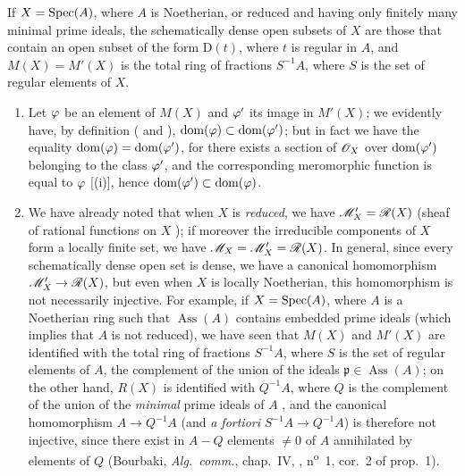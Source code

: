 \begin{corollary}[20.2.12]
\label{IV.20.2.12}
If $X=\operatorname{Spec}(A)$, where $A$ is Noetherian, or reduced and having only finitely many minimal prime ideals, the schematically dense open subsets of $X$ are those that contain an open subset of the form $\mathrm{D}(t)$, where $t$ is regular in $A$, and $M(X)=M'(X)$ is the total ring of fractions $S^{-1}A$, where $S$ is the set of regular elements of $X$.
\end{corollary}

\begin{remarks}[20.2.13]\label{IV.20.2.13}
\begin{enumerate}[label=(\roman*)]
  \item Let $\varphi$ be an element of $M(X)$ and $\varphi'$ its image in $M'(X)$; we evidently have, by definition ( and ), $\operatorname{dom}(\varphi)\subset\operatorname{dom}(\varphi')$; but in fact we have the equality $\operatorname{dom}(\varphi)=\operatorname{dom}(\varphi')$, for there exists a section of $\mathscr{O}_X$ over $\operatorname{dom}(\varphi')$ belonging to the class $\varphi'$, and the corresponding meromorphic function is equal to $\varphi$ [(i)], hence $\operatorname{dom}(\varphi')\subset\operatorname{dom}(\varphi)$.

  \item We have already noted that when $X$ is \emph{reduced}, we have $\mathscr{M}'_X=\mathscr{R}(X)$ (sheaf of rational functions on $X$ ); if moreover the irreducible components of $X$ form a locally finite set, we have $\mathscr{M}_X=\mathscr{M}'_X=\mathscr{R}(X)$.
  In general, since every schematically dense open set is dense, we have a canonical homomorphism $\mathscr{M}'_X\to\mathscr{R}(X)$, but even when $X$ is locally Noetherian, this homomorphism is not necessarily injective.
  For example, if $X=\operatorname{Spec}(A)$, where $A$ is a Noetherian ring such that $\operatorname{Ass}(A)$ contains embedded prime ideals (which implies that $A$ is not reduced), we have seen that $M(X)$ and $M'(X)$ are identified with the total ring of fractions $S^{-1}A$,
  where $S$ is the set of regular elements of $A$, the complement of the union of the ideals $\mathfrak{p}\in\operatorname{Ass}(A)$; on the other hand, $R(X)$ is identified with $Q^{-1}A$, where $Q$ is the complement of the union of the \emph{minimal} prime ideals of $A$ , and the canonical homomorphism $A\to Q^{-1}A$ (and \emph{a fortiori} $S^{-1}A\to Q^{-1}A$) is therefore not injective, since there exist in $A-Q$ elements $\neq0$ of $A$ annihilated by elements of $Q$ (Bourbaki, \emph{Alg.~comm.}, chap.~IV, , n\textsuperscript{o}~1, cor.~2 of prop.~1).


\end{enumerate}
\end{remarks}
